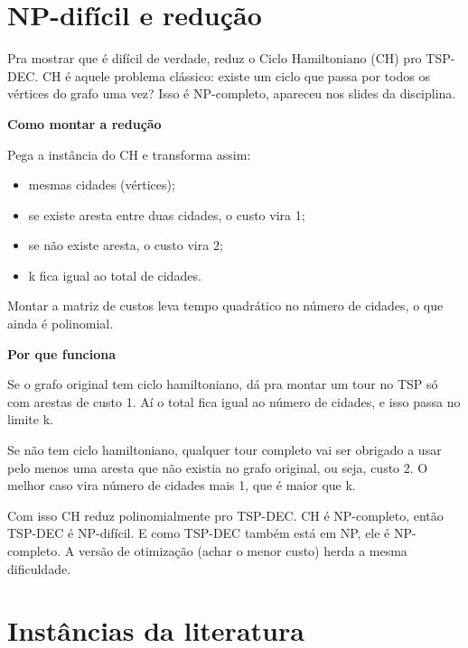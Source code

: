 \documentclass[12pt,a4paper]{article}
\begin{document}
\section{NP-difícil e redução}

Pra mostrar que é difícil de verdade, reduz o Ciclo Hamiltoniano (CH) pro TSP-DEC. CH é aquele problema clássico: existe um ciclo que passa por todos os vértices do grafo uma vez? Isso é NP-completo, apareceu nos slides da disciplina.

\textbf{Como montar a redução}

Pega a instância do CH e transforma assim:
\begin{itemize}
    \item mesmas cidades (vértices);
    \item se existe aresta entre duas cidades, o custo vira 1;
    \item se não existe aresta, o custo vira 2;
    \item k fica igual ao total de cidades.
\end{itemize}

Montar a matriz de custos leva tempo quadrático no número de cidades, o que ainda é polinomial.

\textbf{Por que funciona}

Se o grafo original tem ciclo hamiltoniano, dá pra montar um tour no TSP só com arestas de custo 1. Aí o total fica igual ao número de cidades, e isso passa no limite k.

Se não tem ciclo hamiltoniano, qualquer tour completo vai ser obrigado a usar pelo menos uma aresta que não existia no grafo original, ou seja, custo 2. O melhor caso vira número de cidades mais 1, que é maior que k.

Com isso CH reduz polinomialmente pro TSP-DEC. CH é NP-completo, então TSP-DEC é NP-difícil. E como TSP-DEC também está em NP, ele é NP-completo. A versão de otimização (achar o menor custo) herda a mesma dificuldade.

\begin{center}
\end{center}

\section{Instâncias da literatura}
\end{document}
